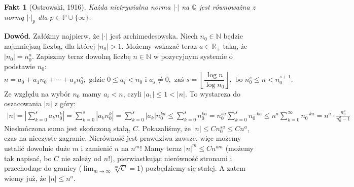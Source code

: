 \documentclass[a4paper,fleqn]{article}
\newtheorem{fkt}{Fakt}
\begin{document}
\begin{multicols}{2}
\begin{fkt}[Ostrowski, 1916] Każda nietrywialna norma $|\cdot|$ na $\mathbb Q$ jest równoważna z normą $|\cdot|_p$ dla $p \in \mathbb P \cup \{\infty\}$.\end{fkt}

\textbf{Dowód}. Załóżmy najpierw, że $|\cdot|$ jest archimedesowska. Niech $n_0 \in\mathbb N$ będzie najmniejszą liczbą, dla której $|n_0| > 1$. Możemy wskazać teraz $a\in\mathbb R_+$ taką, że $|n_0| = n_0^a$. Zapiszmy teraz dowolną liczbę $n\in\mathbb N$ w pozycyjnym systemie o podstawie $n_0$: \[n = a_0 + a_1 n_0 + \cdots + a_s n_0^s, \text{ gdzie }0 \le a_i < n_0 \text{ i } a_s \neq 0, \text{ zaś } s = \left\lfloor\frac{\log n}{\log n_0}\right\rfloor, \text{ bo }n_0^s \le n < n_0^{s+1}.\]
Ze względu na wybór $n_0$ mamy $a_i < n$, czyli $|a_1| \le 1 < |n| $. To wystarcza do oszacowania $|n|$ z góry:
\begin{align*}
|n| = 
\left|\sum_{k=0}^s a_k n_0^{k}\right| = 
\sum_{k=0}^s \left|a_k n_0^{k}\right| = 
\sum_{k=0}^s \left|a_k\right| n_0^{ka} \le
\sum_{k=0}^s n_0^{ka} = 
n_0^{sa} \sum_{k=0}^s n_0^{-ka} \le
n^a \sum_{k=0}^\infty n_0^{-ka} = n^a \cdot \frac{n_0^a}{n_0^a - 1}\end{align*}
Nieskończona suma jest skończoną stałą, $C$. Pokazaliśmy, że $|n| \le Cn_0^{sa} \le Cn^a$, czas na nieczyste zagranie. Nierówność jest prawdziwa zawsze, więc możemy ustalić dowolnie duże $m$ i zamienić $n$ na $n^m$! Mamy teraz $|n|^m \le Cn^{am}$ (możemy tak napisać, bo $C$ nie zależy od $n$!), pierwiastkując nierówność stronami i przechodząc do granicy ($\lim_{m\to\infty} \sqrt[m]{C} = 1$) pozbędziemy się stałej. A zatem wiemy już, że $| n| \le n^a$.


\end{multicols}
\end{document}
